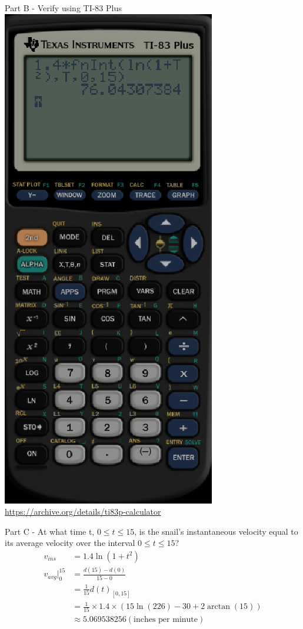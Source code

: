 \documentclass{beamer}
\begin{document}
\begin{frame}{Part B - Verify using TI-83 Plus}
    \includegraphics[scale=0.33]{6}
    \tiny \url{https://archive.org/details/ti83p-calculator}
\end{frame}








\begin{frame}{Part C - At what time t, $0\leq t\leq 15$, is the snail's instantaneous velocity equal to its average velocity over the interval $0\leq t\leq 15$?}
    \begin{align*}
    v_{ins}&=1.4\ln(1+t^2)\\
    v_{avg}\bigg|_0^{15}&=\frac{d(15)-d(0)}{15-0}\\
    &=\frac{1}{15}d(t)_{[0,15]}\\
    &=\frac{1}{15}\times1.4\times (15\ln(226)-30+2\arctan(15))\\
    &\approx 5.069538256 (\text{inches per minute})\\
    \end{align*}
\end{frame}
\end{document}
